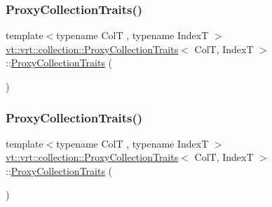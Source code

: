 \subsubsection{\texorpdfstring{Proxy\+Collection\+Traits()}{ProxyCollectionTraits()}\hspace{0.1cm}{\footnotesize\ttfamily [2/4]}}
{\footnotesize\ttfamily template$<$typename ColT , typename IndexT $>$ \\
\hyperlink{structvt_1_1vrt_1_1collection_1_1_proxy_collection_traits}{vt\+::vrt\+::collection\+::\+Proxy\+Collection\+Traits}$<$ ColT, IndexT $>$\+::\hyperlink{structvt_1_1vrt_1_1collection_1_1_proxy_collection_traits}{Proxy\+Collection\+Traits} (\begin{DoxyParamCaption}\item[{\hyperlink{structvt_1_1vrt_1_1collection_1_1_proxy_collection_traits}{Proxy\+Collection\+Traits}$<$ ColT, IndexT $>$ const \&}]{ }\end{DoxyParamCaption})\hspace{0.3cm}{\ttfamily [default]}}

\mbox{\label{structvt_1_1vrt_1_1collection_1_1_proxy_collection_traits_af8c270e30f87c1247a811b6116c3622c}} 
\subsubsection{\texorpdfstring{Proxy\+Collection\+Traits()}{ProxyCollectionTraits()}\hspace{0.1cm}{\footnotesize\ttfamily [3/4]}}
{\footnotesize\ttfamily template$<$typename ColT , typename IndexT $>$ \\
\hyperlink{structvt_1_1vrt_1_1collection_1_1_proxy_collection_traits}{vt\+::vrt\+::collection\+::\+Proxy\+Collection\+Traits}$<$ ColT, IndexT $>$\+::\hyperlink{structvt_1_1vrt_1_1collection_1_1_proxy_collection_traits}{Proxy\+Collection\+Traits} (\begin{DoxyParamCaption}\item[{\hyperlink{structvt_1_1vrt_1_1collection_1_1_proxy_collection_traits}{Proxy\+Collection\+Traits}$<$ ColT, IndexT $>$ \&\&}]{ }\end{DoxyParamCaption})\hspace{0.3cm}{\ttfamily [default]}}

